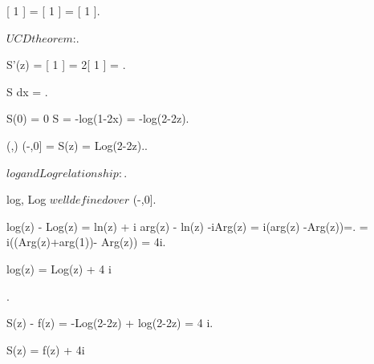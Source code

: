 \documentclass{book}
\begin{document}
{{{			 =  = [ 1 ].

			$UCD theorem$:.

			S'(z) = [ 1 ] = 2[ 1 ] = .

			S \in \int {} dx = .

			S(0) = 0 \imp S = -log(1-2x) = -log(2-2z).

			\D(\frac{ 1 }{ 2 },) \cap \mathbb{\C} \setminus (-\infty,0] = \emptyset \imp S(z) = Log(2-2z)..

			$log and Log relationship:$.

			log, Log $ well defined over $ \mathbb{\C} \setminus (-\infty,0].

			\all{ z \in \mathbb{\C} \setminus (-\infty,0]}
			{
				log(z) - Log(z) = ln(z) + i arg(z) - ln(z) -iArg(z) = i(arg(z) -Arg(z))=.
				= i((Arg(z)+arg(1))- Arg(z)) = 4\pi i.

				log(z) = Log(z) + 4 \pi i
			}.

			{
				S(z) - f(z) = -Log(2-2z) + log(2-2z) = 4 \pi i.

				S(z) = f(z) + 4\pi i
			}

		}
	}
}
\end{document}
